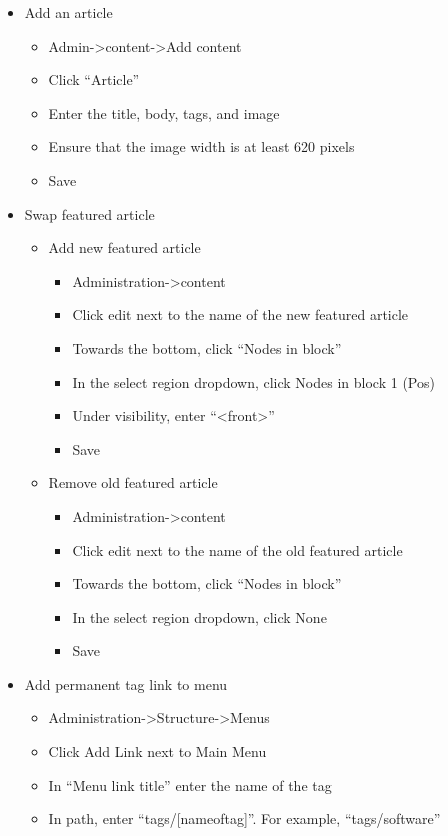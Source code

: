 \documentclass[11pt]{article} %
\begin{document}
\begin{itemize}
\itemindent 0pt
\item Add an article
	\begin{itemize}
	\itemindent 10pt
	\item Admin->content->Add content
	\item Click “Article”
	\item Enter the title, body, tags, and image
	\item Ensure that the image width is at least 620 pixels
	\item Save
	\end{itemize}
\item Swap featured article
	\begin{itemize}
	\itemindent 10pt
	\item Add new featured article
		\begin{itemize}
		\itemindent 20pt
		\item Administration->content
		\item Click edit next to the name of the new featured article
		\item Towards the bottom, click “Nodes in block”
		\item In the select region dropdown, click Nodes in block 1 (Pos)
		\item Under visibility, enter “<front>”
		\item Save
		\end{itemize}
	\item Remove old featured article
		\begin{itemize}
		\itemindent 20pt
		\item Administration->content
		\item Click edit next to the name of the old featured article
		\item Towards the bottom, click “Nodes in block”
		\item In the select region dropdown, click None
		\item Save
		\end{itemize}
	\end{itemize}
\item Add permanent tag link to menu
	\begin{itemize}
	\itemindent 10pt
	\item Administration->Structure->Menus
	\item Click Add Link next to Main Menu
	\item In “Menu link title” enter the name of the tag
	\item In path, enter “tags/[nameoftag]”. For example, “tags/software”

\end{itemize}
\end{itemize}
\end{document}
